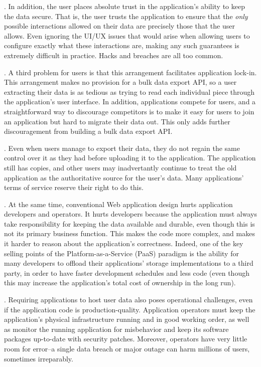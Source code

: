 .  In addition, the user places
absolute trust in the application's ability to keep the
data secure.  That is, the user trusts the application to ensure that the \textit{only}
possible interactions allowed on their data are precisely those that the user
allows.  Even ignoring the UI/UX issues that would arise when allowing users to
configure exactly what these interactions are, making any such guarantees is extremely
difficult in practice.  Hacks and breaches are all too common.

.  A third problem for users is that this arrangement
facilitates application lock-in.
This arrangement makes no provision for a bulk data export API, so a user
extracting their data is as tedious as trying to read each individual piece
through the application's user interface.  In addition,
applications compete for users, and a straightforward way to discourage
competitors is to make it easy for users to join an application but hard to
migrate their data out.  This only adds further discouragement from building
a bulk data export API.

.  Even when users manage to export their data, they do not regain the same control
over it as they had before uploading it to the application.  The application
still has copies, and other users may inadvertantly
continue to treat the old application as the authoritative source for the user's
data.  Many applications' terms of service reserve their right to do this.

.  At the same time, conventional Web
application design hurts application developers and operators.
It hurts developers because the application must always take 
responsibility for keeping the data available and durable, even though this is
not its primary business function.  This makes the code
more complex, and makes it harder to reason about the application's correctness.
Indeed, one of the key selling points of the Platform-as-a-Service (PaaS)
paradigm is the ability for many developers to offload their
applications' storage implementations to a third party, in order to have faster
development schedules and less code (even though this may increase the
application's total cost of ownership in the long run).

.  Requiring applications to host user data also poses operational challenges, even
if the application code is production-quality.  Application operators must keep the
application's physical infrastructure running and in
good working order, as well as monitor the running application for misbehavior and keep
its software packages up-to-date with security patches.  Moreover,
operators have very little room for error--a single data breach or major outage
can harm millions of users, sometimes irreparably.


